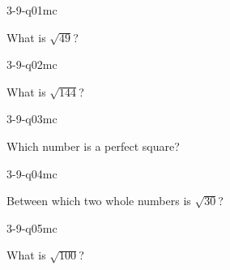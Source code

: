 

\begin{practiceQuestion}{3-9-q01}{mc}
\begin{questionText}
What is $\sqrt{49}$?
\end{questionText}
\end{practiceQuestion}

\begin{practiceQuestion}{3-9-q02}{mc}
\begin{questionText}
What is $\sqrt{144}$?
\end{questionText}
\end{practiceQuestion}

\begin{practiceQuestion}{3-9-q03}{mc}
\begin{questionText}
Which number is a perfect square?
\end{questionText}
\end{practiceQuestion}

\begin{practiceQuestion}{3-9-q04}{mc}
\begin{questionText}
Between which two whole numbers is $\sqrt{30}$?
\end{questionText}
\end{practiceQuestion}

\begin{practiceQuestion}{3-9-q05}{mc}
\begin{questionText}
What is $\sqrt{100}$?
\end{questionText}
\end{practiceQuestion}

